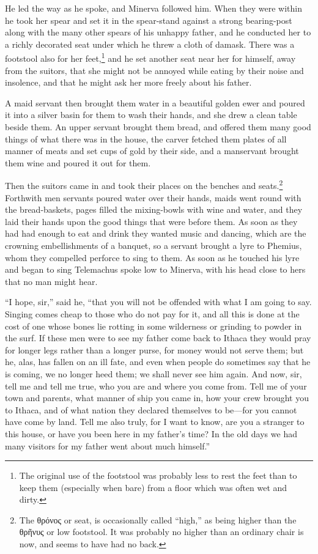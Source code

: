 He led the way as he spoke, and Minerva followed him. When they were within he
took her spear and set it in the spear-stand against a strong bearing-post
along with the many other spears of his unhappy father, and he conducted her to
a richly decorated seat under which he threw a cloth of damask. There was a
footstool also for her feet,\footnote{The original use of the footstool was probably less to rest the feet than to
keep them (especially when bare) from a floor which was often wet and dirty.} and he set another seat near her for
himself, away from the suitors, that she might not be annoyed while eating by
their noise and insolence, and that he might ask her more freely about his
father.

A maid servant then brought them water in a beautiful golden ewer and poured it
into a silver basin for them to wash their hands, and she drew a clean table
beside them. An upper servant brought them bread, and offered them many good
things of what there was in the house, the carver fetched them plates of all
manner of meats and set cups of gold by their side, and a manservant brought
them wine and poured it out for them.

Then the suitors came in and took their places on the benches and seats.\footnote{The θρόνος or seat, is occasionally called
“high,” as being higher than the θρῆνυς or low
footstool. It was probably no higher than an ordinary chair is now, and seems
to have had no back.} Forthwith men
servants poured water over their hands, maids went round with the
bread-baskets, pages filled the mixing-bowls with wine and water, and they laid
their hands upon the good things that were before them. As soon as they had had
enough to eat and drink they wanted music and dancing, which are the crowning
embellishments of a banquet, so a servant brought a lyre to Phemius, whom they
compelled perforce to sing to them. As soon as he touched his lyre and began to
sing Telemachus spoke low to Minerva, with his head close to hers that no man
might hear.

“I hope, sir,” said he, “that you will not be offended with what I am going to
say. Singing comes cheap to those who do not pay for it, and all this is done
at the cost of one whose bones lie rotting in some wilderness or grinding to
powder in the surf. If these men were to see my father come back to Ithaca they
would pray for longer legs rather than a longer purse, for money would not
serve them; but he, alas, has fallen on an ill fate, and even when people do
sometimes say that he is coming, we no longer heed them; we shall never see him
again. And now, sir, tell me and tell me true, who you are and where you come
from. Tell me of your town and parents, what manner of ship you came in, how
your crew brought you to Ithaca, and of what nation they declared themselves to
be—for you cannot have come by land. Tell me also truly, for I want to know,
are you a stranger to this house, or have you been here in my father’s time? In
the old days we had many visitors for my father went about much himself.”

